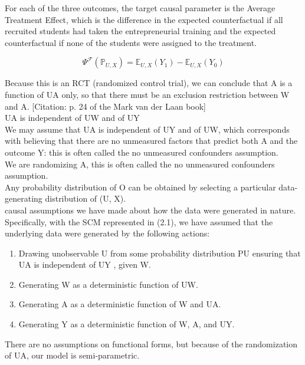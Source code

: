 \documentclass[oneside, notitlepage]{book}
\begin{document}
For each of the three outcomes, the target causal parameter is the Average Treatment Effect, which is the difference in the expected counterfactual if all recruited students had taken the entrepreneurial training and the expected counterfactual if none of the students were assigned to the treatment.

\[ \Psi^{\mathcal{F}}(\mathbb{P}_{U,X}) = \mathbb{E}_{U,X}(Y_1) - \mathbb{E}_{U,X}(Y_0)  \]

Because this is an RCT (randomized control trial), we can conclude that A is a function of UA only, so that there must be an exclusion restriction between W and A. [Citation: p. 24 of the Mark van der Laan book] \\

UA is independent of UW and of UY \\

We may assume that UA is independent of UY and of UW, which corresponds with believing that there are no unmeasured factors that predict both A and the outcome Y: this is often called the no unmeasured confounders assumption. \\

We are randomizing A, this is often called the no unmeasured confounders assumption. \\

Any probability distribution of O can be obtained by selecting a particular data-generating distribution of (U, X). \\

causal assumptions we have made about how the data were generated in nature. Specifically, with the SCM represented in (2.1), we have assumed that the underlying data were generated by the following actions: \\


\begin{enumerate}
\item Drawing unobservable U from some probability distribution PU ensuring that UA is independent of UY , given W.
\item Generating W as a deterministic function of UW.
\item Generating A as a deterministic function of W and UA.
\item Generating Y as a deterministic function of W, A, and UY.
\end{enumerate} 

There are no assumptions on functional forms, but because of the randomization of UA, our model is semi-parametric.\\
\end{document}
